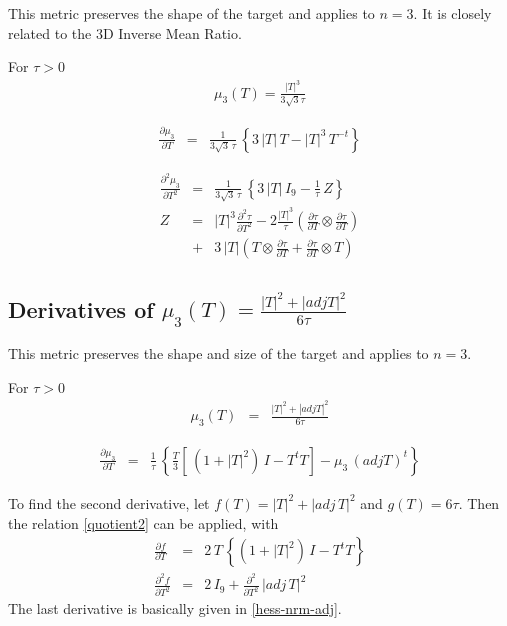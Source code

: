 \documentclass{report}
\begin{document}
\noindent This metric preserves the shape of the target and applies
to $n=3$. It is closely related to the 3D Inverse Mean Ratio. \newline

\noindent For $\tau>0$
\begin{eqnarray}
\mu_3(T)=\frac{|T|^3}{3 \sqrt{3} \tau}
\end{eqnarray}

\begin{eqnarray}
\frac{\partial \mu_3}{\partial T} & = & \frac{1}{3 \sqrt{3} \, \tau} \, \left\{ 3 \, |T| \, T - |T|^3 \, T^{-t} \right\}
\end{eqnarray}


\begin{eqnarray}
\frac{\partial^2 \mu_3}{\partial T^2} & = & \frac{1}{3 \sqrt{3} \, \tau} \, \left\{ 3 \, |T| \, I_9 - \frac{1}{\tau} \, Z \right\} \\
Z & = & |T|^3 \frac{\partial^2 \tau}{\partial T^2} - 2 \frac{|T|^3}{\tau} \left( \frac{\partial \tau}{\partial T} \otimes \frac{\partial \tau}{\partial T} \right) \nonumber \\
 & + & 3 \, |T| \left( T \otimes \frac{\partial \tau}{\partial T} + \frac{\partial \tau}{\partial T} \otimes T \right)
\end{eqnarray}

\subsection{Derivatives of $\mu_3(T)=\frac{|T|^2 + |adj T|^2}{6 \tau}$}

\noindent This metric preserves the shape and size of the target and applies
to $n=3$. \newline

\noindent For $\tau>0$
\begin{eqnarray}
\mu_3 (T) & = & \frac{|T|^2 + |adj T|^2}{6 \tau}
\end{eqnarray}

\begin{eqnarray}
\frac{\partial \mu_3}{\partial T} & = & \frac{1}{\tau} \, \left\{ \frac{T}{3} \left[ \, (1+|T|^2) \, I - T^t T \right] - \mu_3 \, (adj T)^t \right\}
\end{eqnarray}

\noindent To find the second derivative, let $f(T)=|T|^2 + |adj \, T|^2$ and
$g(T)=6 \tau$.  Then the relation \ref{quotient2} can be applied, with
\begin{eqnarray}
\frac{\partial f}{\partial T} & = & 2 \, T \, \left\{ \left( 1 + |T|^2 \right) \, I - T^t T \right\} \\
\frac{\partial^2 f}{\partial T^2} & = & 2 \, I_9 + \frac{\partial^2}{\partial T^2} \, |adj \, T|^2
\end{eqnarray}
The last derivative is basically given in \ref{hess-nrm-adj}. \newline
\end{document}
